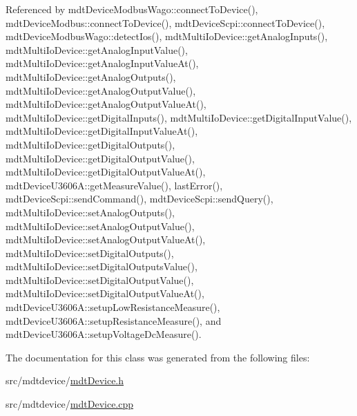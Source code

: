 Referenced by mdt\-Device\-Modbus\-Wago\-::connect\-To\-Device(), mdt\-Device\-Modbus\-::connect\-To\-Device(), mdt\-Device\-Scpi\-::connect\-To\-Device(), mdt\-Device\-Modbus\-Wago\-::detect\-Ios(), mdt\-Multi\-Io\-Device\-::get\-Analog\-Inputs(), mdt\-Multi\-Io\-Device\-::get\-Analog\-Input\-Value(), mdt\-Multi\-Io\-Device\-::get\-Analog\-Input\-Value\-At(), mdt\-Multi\-Io\-Device\-::get\-Analog\-Outputs(), mdt\-Multi\-Io\-Device\-::get\-Analog\-Output\-Value(), mdt\-Multi\-Io\-Device\-::get\-Analog\-Output\-Value\-At(), mdt\-Multi\-Io\-Device\-::get\-Digital\-Inputs(), mdt\-Multi\-Io\-Device\-::get\-Digital\-Input\-Value(), mdt\-Multi\-Io\-Device\-::get\-Digital\-Input\-Value\-At(), mdt\-Multi\-Io\-Device\-::get\-Digital\-Outputs(), mdt\-Multi\-Io\-Device\-::get\-Digital\-Output\-Value(), mdt\-Multi\-Io\-Device\-::get\-Digital\-Output\-Value\-At(), mdt\-Device\-U3606\-A\-::get\-Measure\-Value(), last\-Error(), mdt\-Device\-Scpi\-::send\-Command(), mdt\-Device\-Scpi\-::send\-Query(), mdt\-Multi\-Io\-Device\-::set\-Analog\-Outputs(), mdt\-Multi\-Io\-Device\-::set\-Analog\-Output\-Value(), mdt\-Multi\-Io\-Device\-::set\-Analog\-Output\-Value\-At(), mdt\-Multi\-Io\-Device\-::set\-Digital\-Outputs(), mdt\-Multi\-Io\-Device\-::set\-Digital\-Outputs\-Value(), mdt\-Multi\-Io\-Device\-::set\-Digital\-Output\-Value(), mdt\-Multi\-Io\-Device\-::set\-Digital\-Output\-Value\-At(), mdt\-Device\-U3606\-A\-::setup\-Low\-Resistance\-Measure(), mdt\-Device\-U3606\-A\-::setup\-Resistance\-Measure(), and mdt\-Device\-U3606\-A\-::setup\-Voltage\-Dc\-Measure().



The documentation for this class was generated from the following files\-:\begin{DoxyCompactItemize}
\item 
src/mdtdevice/\hyperlink{mdt_device_8h}{mdt\-Device.\-h}\item 
src/mdtdevice/\hyperlink{mdt_device_8cpp}{mdt\-Device.\-cpp}\end{DoxyCompactItemize}
